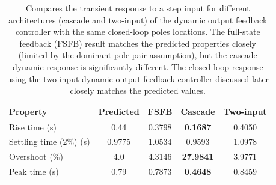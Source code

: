 \begin{table}[t] \caption{Compares the transient response to a step input for different architectures (cascade and two-input) of the dynamic output feedback controller with the same closed-loop poles locations. The full-state feedback (FSFB) result matches the predicted properties closely (limited by  the dominant pole pair assumption), but the cascade dynamic response is significantly different. The closed-loop response using the two-input dynamic output feedback controller discussed later closely matches the predicted values.} \vspace*{.1in}
	\centering
	\begin{tabular}{|l||c|c|c|c|} \hline 
		Property & Predicted & FSFB & Cascade & Two-input\\ \hline\hline
		Rise time (s) & 0.44 & 0.3798 & \textbf{0.1687} &0.4050\\
		Settling time (2\%) (s) &  0.9775 & 1.0534& 0.9593&1.0978\\
		Overshoot (\%)& 4.0 & 4.3146& \textbf{27.9841}&3.9771\\
		Peak time (s) & 0.79 & 0.7873& \textbf{0.4648}&0.8459 \\ \hline
	\end{tabular}
\end{table}

